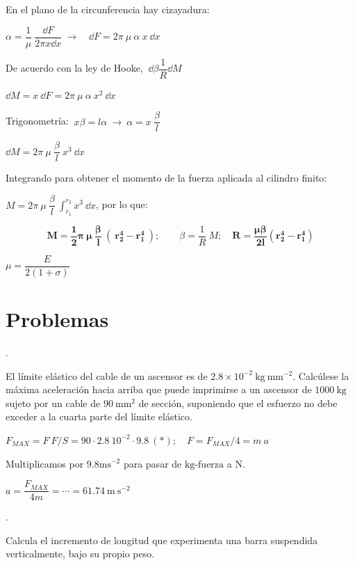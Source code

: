 En el plano de la circunferencia hay cizayadura:

 $\alpha=\dfrac 1 \mu \ \dfrac {\dd F}{2\pi x \dd x} \ \to \quad  \dd F=2 \pi \ \mu \ \alpha \ x \ \dd x$
 
 
De acuerdo con la ley de Hooke, $\ \dd \beta \dfrac 1 R \dd M$

$\dd M = x \ \dd F = 2 \pi \ \mu \ \alpha \ x^2 \ \dd x$

Trigonometría: $\ x\beta = l \alpha \ \to \ \alpha=x\ \dfrac \beta l$

$\dd M = 2\pi \ \mu \ \dfrac \beta l \ x^3 \ \dd x$

Integrando para obtener el momento de la fuerza aplicada al cilindro finito:

$M=\displaystyle  2\pi \ \mu \ \dfrac \beta l \ \int_{r_1}^{r_2} x^3 \ \dd x$, por lo que:

$$\boldsymbol{M= \dfrac 1 2 \pi \ \mu \ \dfrac \beta l \ (\ r_2^4-r_1^4\ )}; \qquad \beta=\dfrac 1 R\ M; \quad \boldsymbol{R=\dfrac{\mu \beta}{2l}(r_2^4-r_1^4)}$$

\textcolor{gris}{$\mu=\dfrac{E}{2(1+\sigma)}$}

\newpage %
\section{Problemas}

\begin{prob}.

El límite elástico del cable de un ascensor es de $2.8 \times 10^{-2}\ \mathrm{kg} \ \mathrm{mm}^{-2}$. Calcúlese la máxima aceleración hacia arriba que puede imprimirse a un ascensor de $1000\ \mathrm{kg}$ sujeto por un cable de $90\ \mathrm{mm}^2$ de sección, suponiendo que el esfuerzo no debe exceder a la cuarta parte del límite elástico.	
\end{prob}

$F_{MAX}=F\ F/S = 90\cdot 2.8\ 10^{-2} \cdot 9.8 \ (*);\quad F=F_{MAX}/4=m\ a$

\textcolor{gris}{Multiplicamos por $9.8 \mathrm{ms}^{-2}$ para pasar de $\mathrm{kg}$-$\mathrm{fuerza}$ a $\mathrm{N}$.}

$a=\dfrac{F_{MAX}}{4m}=\cdots =61.74\ \mathrm{m\ s}^{-2}$

\begin{prob}.

Calcula el incremento de longitud que experimenta una barra suspendida verticalmente, bajo su propio peso.	
\end{prob}

